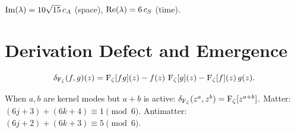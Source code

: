 \begin{theorem}
\label{thm:sqrt15}
$\operatorname{Im}(\lambda) = 10\sqrt{15}\,c_A$ (space),
$\operatorname{Re}(\lambda) = 6\,c_S$ (time).
\end{theorem}

\section{Derivation Defect and Emergence}

\begin{definition}
\label{def:deriv-defect}
\[
  \delta_{\operatorname{F_\zeta}}(f,g)(z) = \operatorname{F_\zeta}[fg](z) - f(z)\,\operatorname{F_\zeta}[g](z) - \operatorname{F_\zeta}[f](z)\,g(z).
\]
\end{definition}

\begin{theorem}
\label{thm:emergence}
When $a,b$ are kernel modes but $a+b$ is active:
$\delta_{\operatorname{F_\zeta}}(z^a, z^b) = \operatorname{F_\zeta}[z^{a+b}]$.
Matter: $(6j+3)+(6k+4) \equiv 1\pmod6$.
Antimatter: $(6j+2)+(6k+3) \equiv 5\pmod6$.
\end{theorem}
